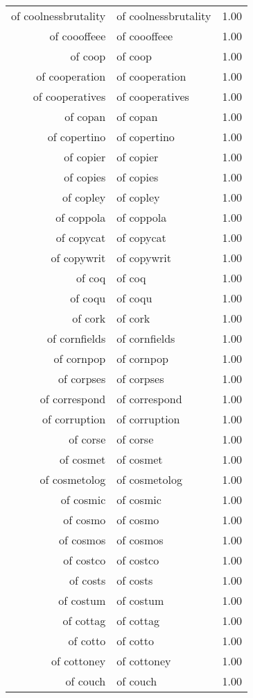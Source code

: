 \begin{table}[ht]
\begin{tabular}{rlr}
  of coolnessbrutality & of coolnessbrutality & 1.00 \\ 
  of coooffeee & of coooffeee & 1.00 \\ 
  of coop & of coop & 1.00 \\ 
  of cooperation & of cooperation & 1.00 \\ 
  of cooperatives & of cooperatives & 1.00 \\ 
  of copan & of copan & 1.00 \\ 
  of copertino & of copertino & 1.00 \\ 
  of copier & of copier & 1.00 \\ 
  of copies & of copies & 1.00 \\ 
  of copley & of copley & 1.00 \\ 
  of coppola & of coppola & 1.00 \\ 
  of copycat & of copycat & 1.00 \\ 
  of copywrit & of copywrit & 1.00 \\ 
  of coq & of coq & 1.00 \\ 
  of coqu & of coqu & 1.00 \\ 
  of cork & of cork & 1.00 \\ 
  of cornfields & of cornfields & 1.00 \\ 
  of cornpop & of cornpop & 1.00 \\ 
  of corpses & of corpses & 1.00 \\ 
  of correspond & of correspond & 1.00 \\ 
  of corruption & of corruption & 1.00 \\ 
  of corse & of corse & 1.00 \\ 
  of cosmet & of cosmet & 1.00 \\ 
  of cosmetolog & of cosmetolog & 1.00 \\ 
  of cosmic & of cosmic & 1.00 \\ 
  of cosmo & of cosmo & 1.00 \\ 
  of cosmos & of cosmos & 1.00 \\ 
  of costco & of costco & 1.00 \\ 
  of costs & of costs & 1.00 \\ 
  of costum & of costum & 1.00 \\ 
  of cottag & of cottag & 1.00 \\ 
  of cotto & of cotto & 1.00 \\ 
  of cottoney & of cottoney & 1.00 \\ 
  of couch & of couch & 1.00 \\ 

\end{tabular}
\end{table}
